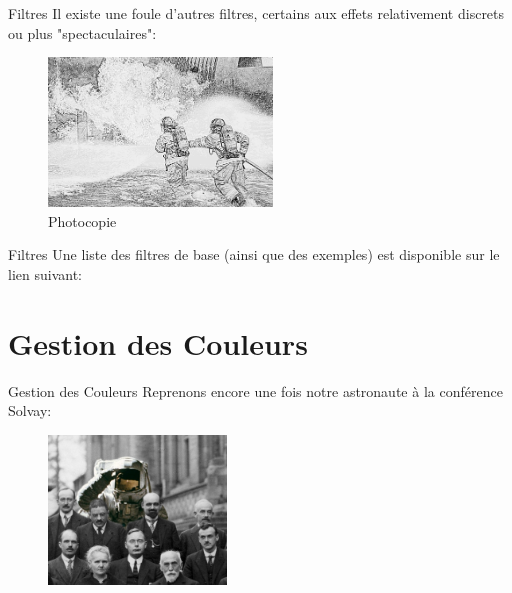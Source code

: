 \documentclass[10pt,svgnames,usenames,table]{beamer}
\begin{document}
\begin{frame}{Filtres}
		Il existe une foule d'autres filtres, certains aux effets relativement discrets ou plus "spectaculaires":
	
		\begin{figure}[H]
			\centering
				\includegraphics[height=150px]{Images/filters/photocopy} 
				\caption{Photocopie}
	\end{figure}	
	\end{frame}

\begin{frame}{Filtres}
	Une liste des filtres de base (ainsi que des exemples) est disponible sur le lien suivant:



\end{frame}



\section{Gestion des Couleurs}
	\begin{frame}{Gestion des Couleurs}
		Reprenons encore une fois notre astronaute à la conférence Solvay:

		\begin{figure}
			\centering
			\includegraphics[height=150px]{Images/colours/col1} 
		\end{figure}
	\end{frame}
\end{document}

